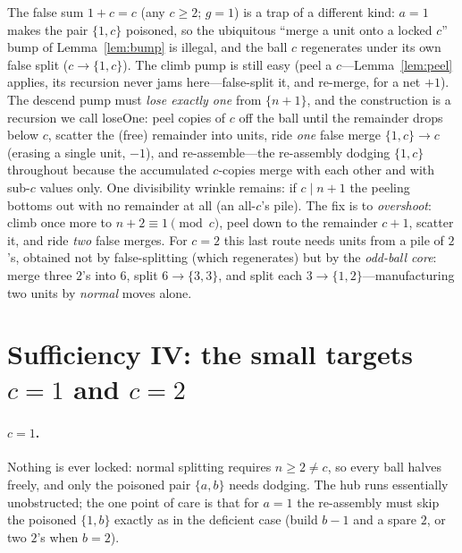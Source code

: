 \documentclass[11pt]{article}
\theoremstyle{definition}
\theoremstyle{remark}
\newcommand{\ms}[1]{\{#1\}}
\begin{document}
The false sum $1+c=c$ (any $c\ge2$; $g=1$) is a trap of a different kind:
$a=1$ makes the pair $\{1,c\}$ poisoned, so the ubiquitous ``merge a unit
onto a locked $c$'' bump of Lemma~\ref{lem:bump} is illegal, and the ball
$c$ regenerates under its own false split ($c\to\{1,c\}$).  The climb pump
is still easy (peel a $c$---Lemma~\ref{lem:peel} applies, its recursion
never jams here---false-split it, and re-merge, for a net $+1$).  The
descend pump must \emph{lose exactly one} from $\ms{n+1}$, and the
construction is a recursion we call \textsf{loseOne}: peel copies of $c$
off the ball until the remainder drops below $c$, scatter the (free)
remainder into units, ride \emph{one} false merge $\{1,c\}\to c$
(erasing a single unit, $-1$), and re-assemble---the re-assembly dodging
$\{1,c\}$ throughout because the accumulated $c$-copies merge with each
other and with sub-$c$ values only.  One divisibility wrinkle remains: if
$c\mid n+1$ the peeling bottoms out with no remainder at all (an all-$c$'s
pile).  The fix is to \emph{overshoot}: climb once more to $n+2\equiv
1\pmod c$, peel down to the remainder $c+1$, scatter it, and ride
\emph{two} false merges.  For $c=2$ this last route needs units from a pile
of $2$'s, obtained not by false-splitting (which regenerates) but by the
\emph{odd-ball core}: merge three $2$'s into $6$, split $6\to\{3,3\}$, and
split each $3\to\{1,2\}$---manufacturing two units by \emph{normal} moves
alone.

\section{Sufficiency IV: the small targets \texorpdfstring{$c=1$ and $c=2$}{c=1 and c=2}}
\label{sec:smallc}

\paragraph{$c=1$.}
Nothing is ever locked: normal splitting requires $n\ge2\ne c$, so every
ball halves freely, and only the poisoned pair $\{a,b\}$ needs dodging.
The hub runs essentially unobstructed; the one point of care is that for
$a=1$ the re-assembly must skip the poisoned $\{1,b\}$ exactly as in the
deficient case (build $b-1$ and a spare $2$, or two $2$'s when $b=2$).
\end{document}
